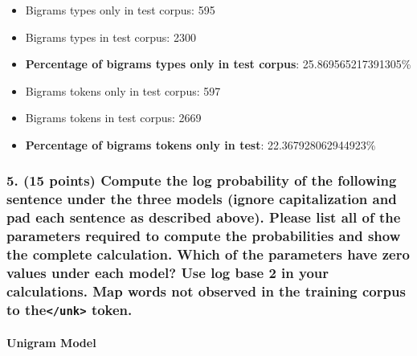 \documentclass{article}
\begin{document}
\begin{itemize}
\item Bigrams types only in test corpus: 595
\item Bigrams types in test corpus: 2300
\item \textbf{Percentage of bigrams types only in test corpus}: 25.869565217391305\%
\item Bigrams tokens only in test corpus: 597
\item Bigrams tokens in test corpus: 2669
\item \textbf{Percentage of bigrams tokens only in test}: 22.367928062944923\%
\end{itemize}

\subsubsection*{5. (15 points) Compute the log probability of the following sentence under the three models (ignore capitalization and pad each sentence as described above). Please list all of the parameters required to compute the probabilities and show the complete calculation. Which of the parameters have zero values under each model? Use log base 2 in your calculations. Map words not observed in the training corpus to the\texttt{</unk>} token.}

\paragraph{Unigram Model}
\end{document}
